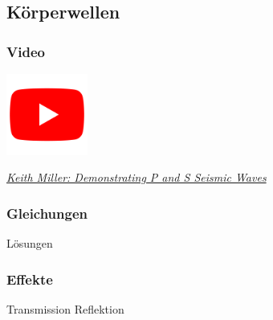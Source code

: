 \subsection{Körperwellen}

\begin{frame}
\frametitle{Video}
\begin{center}
\includegraphics[width=0.2\textwidth]{fig_img/youtube.png}   
\end{center}


\href{https://www.youtube.com/watch?v=gjRGIpP-Qfw}{\textsl{Keith Miller: Demonstrating P and S Seismic Waves}}

\end{frame}


\begin{frame}
\frametitle{Gleichungen}
Lösungen
\end{frame}


\begin{frame}
\frametitle{Effekte}
Transmission
Reflektion

\end{frame}
